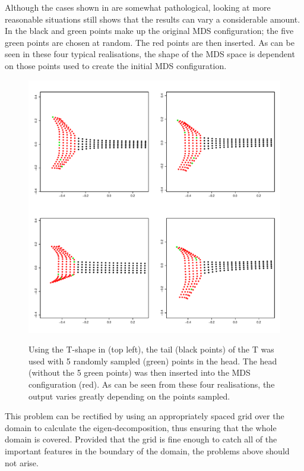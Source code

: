Although the cases shown in  are somewhat pathological, looking at more reasonable situations still shows that the results can vary a considerable amount. In  the black and green points make up the original MDS configuration; the five green points are chosen at random. The red points are then inserted. As can be seen in these four typical realisations, the shape of the MDS space is dependent on those points used to create the initial MDS configuration.

\begin{figure}
\centering
\includegraphics[width=6in]{mds/figs/tshaperand.pdf} \\
\caption{Using the T-shape in  (top left), the tail (black points) of the T was used with 5 randomly sampled (green) points in the head. The head (without the 5 green points) was then inserted into the MDS configuration (red). As can be seen from these four realisations, the output varies greatly depending on the points sampled.}
\label{tshaperand}
\end{figure}

This problem can be rectified by using an appropriately spaced grid over the domain to calculate the eigen-decomposition, thus ensuring that the whole domain is covered. Provided that the grid is fine enough to catch all of the important features in the boundary of the domain, the problems above should not arise.

